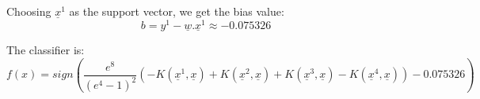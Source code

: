 \documentclass[letter, 12pt]{article}
\begin{document}
\begin{enumerate}
\begin{itemize}
    		\par{Choosing $ \underline{x}^1 $ as the support vector, we get the bias value:}
    		\[ b = y^1 - \underline{w}.\underline{x}^1 \approx -0.075326 \]
    		\par{The classifier is:}
    		\[ f(x) = sign(\frac{e^8}{(e^4 - 1)^2}(-K(\underline{x}^1, \underline{x}) + K(\underline{x}^2, \underline{x}) + K(\underline{x}^3, \underline{x}) - K(\underline{x}^4, \underline{x})) -0.075326) \]
    	\end{itemize}
    \end{enumerate}
\end{document}
